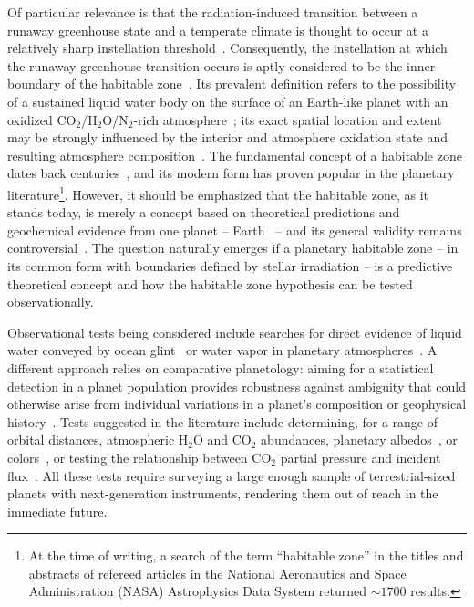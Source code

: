 \documentclass[twocolumn,twocolappendix]{aastex631}
\begin{document}
Of particular relevance is that the radiation-induced transition between a runaway greenhouse state and a temperate climate is thought to occur at a relatively sharp instellation threshold~\citep{Goldblatt2013,Leconte2013,Kopparapu2013}.
Consequently, the instellation at which the runaway greenhouse transition occurs is aptly considered to be the inner boundary of the habitable zone~\citep[e.g.,][]{Ramirez2018,Salvador2023b}.
Its prevalent definition refers to the possibility of a sustained liquid water body on the surface of an Earth-like planet with an oxidized CO$_2$/H$_2$O/N$_2$-rich atmosphere~\citep[][]{Kasting1993,Kopparapu2013,Kopparapu2014};
its exact spatial location and extent may be strongly influenced by the interior and atmosphere oxidation state and resulting atmosphere composition~\citep{2011ApJ...734L..13P,2017ApJ...837L...4R,2018ApJ...858...72R,2019ApJ...875...31K,2020ApJ...896..115G,2022JGRE..12707456G,2023ApJ...942L..20H}.
The fundamental concept of a habitable zone dates back centuries~\citep{Newton1687,Whewell1858,Shapley1953,Huang1959}, and its modern form has proven popular in the planetary literature\footnote{At the time of writing, a search of the term ``habitable zone'' in the titles and abstracts of refereed articles in the National Aeronautics and Space Administration (NASA) Astrophysics Data System returned $\sim\num{1700}$ results.}.
However, it should be emphasized that the habitable zone, as it stands today, is merely a concept based on theoretical predictions and geochemical evidence from one planet -- Earth~\citep{2020SciA....6.1420C} -- and its general validity remains controversial~\citep[e.g.,][]{Cockell2016,Moore2017,Tuchow2023}.
The question naturally emerges if a planetary habitable zone -- in its common form with boundaries defined by stellar irradiation -- is a predictive theoretical concept and how the habitable zone hypothesis can be tested observationally.

Observational tests being considered include searches for direct evidence of liquid water conveyed by ocean glint~\citep{Williams2008,Robinson2010,Lustig-Yaeger2018} or water vapor in planetary atmospheres~\citep{Suissa2020}.
A different approach relies on comparative planetology:
aiming for a statistical detection in a planet population provides robustness against ambiguity that could otherwise arise from individual variations in a planet's composition or geophysical history~\citep{Checlair2019,Apai2019a}.
Tests suggested in the literature include determining, for a range of orbital distances, atmospheric H$_{2}$O and CO$_2$ abundances, planetary albedos~\citep{Bean2017,Bixel2021}, or colors~\citep{Crow2011,Bixel2020}, or testing the relationship between CO$_2$ partial pressure and incident flux~\citep{Lehmer2020}.
All these tests require surveying a large enough sample of terrestrial-sized planets with next-generation instruments, rendering them out of reach in the immediate future.
\end{document}
